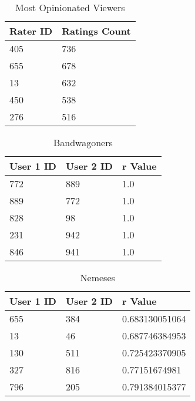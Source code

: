 \begin{table}[h!]
\centering
\begin{tabular}{| l | l |}
\hline
Rater ID & Ratings Count \\
\hline
405 & 736 \\
655 & 678 \\
13 & 632 \\
450 & 538 \\
276 & 516 \\
\hline
\end{tabular}
\caption{Most Opinionated Viewers}
\label{tab:opinion}
\end{table}

\begin{table}[h!]
\centering
\begin{tabular}{| l | l | l |}
\hline
User 1 ID & User 2 ID & r Value \\
\hline
772 & 889 & 1.0 \\
889 & 772 & 1.0 \\
828 & 98 & 1.0 \\
231 & 942 & 1.0 \\
846 & 941 & 1.0 \\
\hline
\end{tabular}
\caption{Bandwagoners}
\label{tab:band}
\end{table}

\begin{table}[h!]
\centering
\begin{tabular}{| l | l | l |}
\hline
User 1 ID & User 2 ID & r Value \\
\hline
655 & 384 & 0.683130051064 \\
13 & 46 & 0.687746384953 \\
130 & 511 & 0.725423370905 \\
327 & 816 & 0.77151674981 \\
796 & 205 & 0.791384015377 \\
\hline
\end{tabular}
\caption{Nemeses}
\label{tab:cont}
\end{table}

